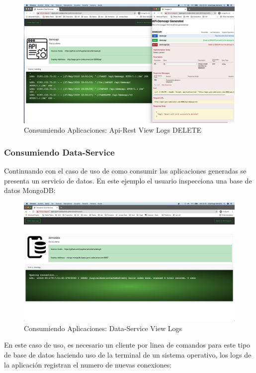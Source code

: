 \documentclass[a4paper,11pt]{book}
\begin{document}
\begin{figure}[H]
\centering
\includegraphics[scale=0.2]{imagenes/casouso/1_11.png}
\caption{ Consumiendo Aplicaciones: Api-Rest View Logs DELETE  }
\end{figure}

\subsubsection{Consumiendo Data-Service}

Continuando con el caso de uso de como consumir las aplicaciones generadas se presenta un servicio de datos. En este ejemplo el usuario inspecciona una base de datos MongoDB: 

\begin{figure}[H]
\centering
\includegraphics[scale=0.2]{imagenes/casouso/1_13.png}
\caption{ Consumiendo Aplicaciones: Data-Service View Logs  }
\end{figure}

En este caso de uso, es necesario un cliente por linea de comandos para este tipo de base de datos haciendo uso de la terminal de un sistema operativo, los logs de la aplicación registran el numero de nuevas conexiones: 
\end{document}
